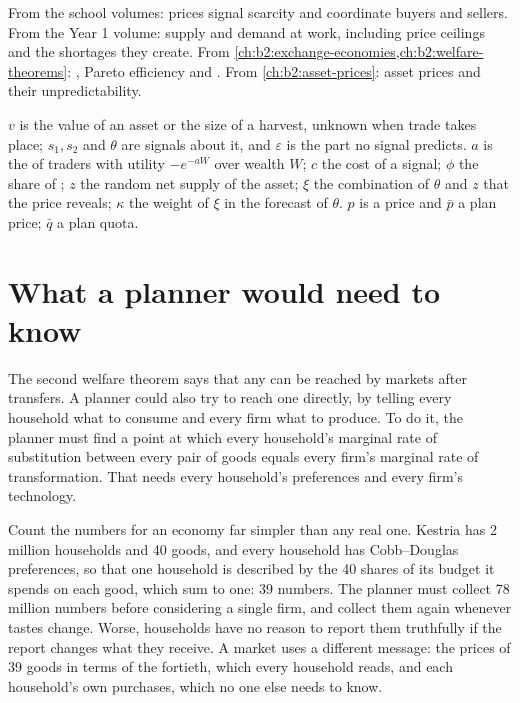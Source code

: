 \begin{recall}
From the school volumes: prices signal scarcity and coordinate buyers and sellers. From the Year 1
volume: supply and demand at work, including price ceilings and the shortages they create. From
\cref{ch:b2:exchange-economies,ch:b2:welfare-theorems}: , Pareto efficiency and
. From \cref{ch:b2:asset-prices}: asset prices and their unpredictability.
\end{recall}

\begin{notation}\label{not:b2:prices-as-information:symbols}
$v$ is the value of an asset or the size of a harvest, unknown when trade takes place; $s_1, s_2$ and
$\theta$ are signals about it, and $\varepsilon$ is the part no signal predicts. $a$ is the  of traders with utility $-e^{-aW}$ over wealth $W$; $c$ the cost of a signal;
$\phi$ the share of ; $z$ the random net supply of the asset; $\xi$ the combination of
$\theta$ and $z$ that the price reveals; $\kappa$ the weight of $\xi$ in the forecast of $\theta$. $p$ is a
price and $\bar p$ a plan price; $\bar q$ a plan quota.
\end{notation}

\section{What a planner would need to know}\label{sec:b2:prices-as-information:planner}

The second welfare theorem says that any  can be reached by markets after
transfers. A planner could also try to reach one directly, by telling every household what to consume
and every firm what to produce. To do it, the planner must find a point at which every household's
marginal rate of substitution between every pair of goods equals every firm's marginal rate of
transformation. That needs every household's preferences and every firm's technology.

Count the numbers for an economy far simpler than any real one. Kestria has 2 million households and 40
goods, and every household has Cobb--Douglas preferences, so that one household is described by the 40
shares of its budget it spends on each good, which sum to one: 39 numbers. The planner must collect 78
million numbers before considering a single firm, and collect them again whenever tastes change. Worse,
households have no reason to report them truthfully if the report changes what they receive. A market
uses a different message: the prices of 39 goods in terms of the fortieth, which every household reads,
and each household's own purchases, which no one else needs to know.

